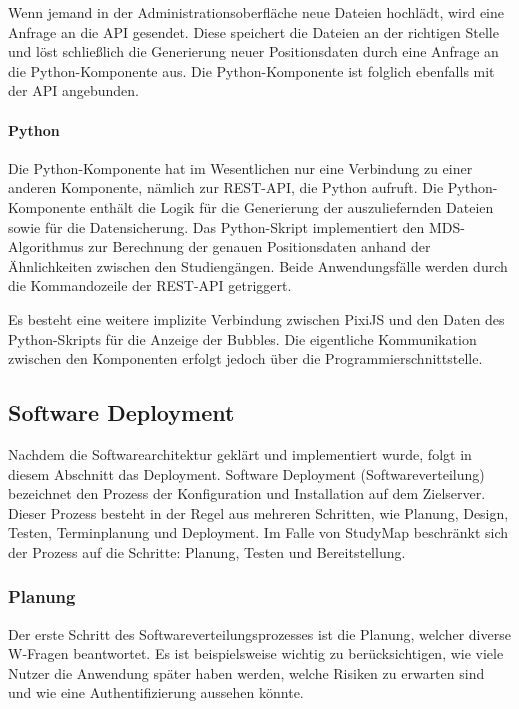 Wenn jemand in der Administrationsoberfläche neue Dateien hochlädt, wird eine Anfrage an die API gesendet. Diese speichert die Dateien an der richtigen Stelle und löst schließlich die Generierung neuer Positionsdaten durch eine Anfrage an die Python-Komponente aus. Die Python-Komponente ist folglich ebenfalls mit der API angebunden.

\paragraph*{Python}
Die Python-Komponente hat im Wesentlichen nur eine Verbindung zu einer anderen Komponente, nämlich zur REST-API, die Python aufruft. Die Python-Komponente enthält die Logik für die Generierung der auszuliefernden Dateien sowie für die Datensicherung. Das Python-Skript implementiert den MDS-Algorithmus zur Berechnung der genauen Positionsdaten anhand der Ähnlichkeiten zwischen den Studiengängen. Beide Anwendungsfälle werden durch die Kommandozeile der REST-API getriggert.

Es besteht eine weitere implizite Verbindung zwischen PixiJS und den Daten des Python-Skripts für die Anzeige der Bubbles. Die eigentliche Kommunikation zwischen den Komponenten erfolgt jedoch über die Programmierschnittstelle.

\newpage
\subsection{Software Deployment}\label{sec:deployment}
Nachdem die Softwarearchitektur geklärt und implementiert wurde, folgt in diesem Abschnitt das Deployment. Software Deployment (Softwareverteilung) bezeichnet den Prozess der Konfiguration und Installation auf dem Zielserver. Dieser Prozess besteht in der Regel aus mehreren Schritten, wie Planung, Design, Testen, Terminplanung und Deployment. \parencite{atera_team_was_2023} Im Falle von StudyMap beschränkt sich der Prozess auf die Schritte: Planung, Testen und Bereitstellung.

\subsubsection{Planung}
Der erste Schritt des Softwareverteilungsprozesses ist die Planung, welcher diverse W-Fragen beantwortet. Es ist beispielsweise wichtig zu berücksichtigen, wie viele Nutzer die Anwendung später haben werden, welche Risiken zu erwarten sind und wie eine Authentifizierung aussehen könnte. \parencite{atera_team_was_2023}

